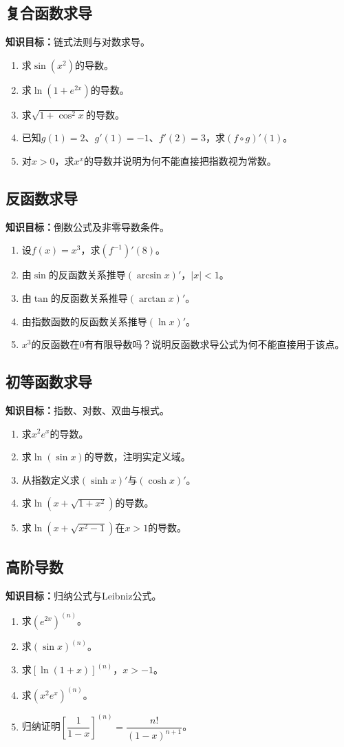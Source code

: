 \documentclass[11pt,a4paper,fontset=fandol]{ctexrep}
\newcommand{\goal}[1]{\textbf{知识目标：}#1\par}
\begin{document}
\subsection{复合函数求导}
\goal{链式法则与对数求导。}
\begin{enumerate}
\item 求$\sin(x^2)$的导数。
\item 求$\ln(1+e^{2x})$的导数。
\item 求$\sqrt{1+\cos^2x}$的导数。
\item 已知$g(1)=2$、$g'(1)=-1$、$f'(2)=3$，求$(f\circ g)'(1)$。
\item 对$x>0$，求$x^x$的导数并说明为何不能直接把指数视为常数。
\end{enumerate}
\subsection{反函数求导}
\goal{倒数公式及非零导数条件。}
\begin{enumerate}
\item 设$f(x)=x^3$，求$(f^{-1})'(8)$。
\item 由$\sin$的反函数关系推导$(\arcsin x)'$，$|x|<1$。
\item 由$\tan$的反函数关系推导$(\arctan x)'$。
\item 由指数函数的反函数关系推导$(\ln x)'$。
\item $x^3$的反函数在0有有限导数吗？说明反函数求导公式为何不能直接用于该点。
\end{enumerate}
\subsection{初等函数求导}
\goal{指数、对数、双曲与根式。}
\begin{enumerate}
\item 求$x^2e^x$的导数。
\item 求$\ln(\sin x)$的导数，注明实定义域。
\item 从指数定义求$(\sinh x)'$与$(\cosh x)'$。
\item 求$\ln(x+\sqrt{1+x^2})$的导数。
\item 求$\ln(x+\sqrt{x^2-1})$在$x>1$的导数。
\end{enumerate}
\subsection{高阶导数}
\goal{归纳公式与Leibniz公式。}
\begin{enumerate}
\item 求$(e^{2x})^{(n)}$。
\item 求$(\sin x)^{(n)}$。
\item 求$[\ln(1+x)]^{(n)}$，$x>-1$。
\item 求$(x^2e^x)^{(n)}$。
\item 归纳证明$\left[\dfrac{1}{1-x}\right]^{(n)}=\dfrac{n!}{(1-x)^{n+1}}$。
\end{enumerate}
\end{document}
